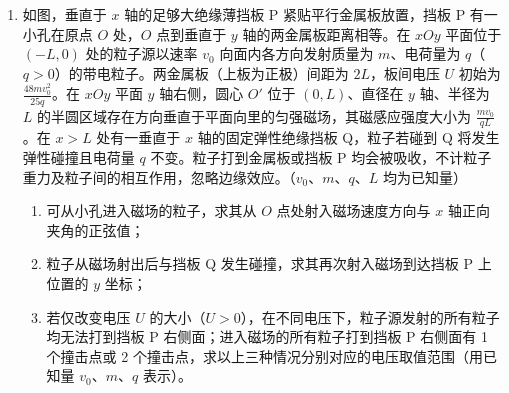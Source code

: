 \documentclass[\gkver]{gaokaozhenti}
\begin{document}
\begin{enumerate}
{所以 AB 段动量的变化量为 $\Delta p=mv-0=720\Ukgms$。

（3）乙从 A 滑到 B 的过程根据运动学公式有 $L=v_{0}t'+\frac{1}{2}at'^{2}$，

代入数据解得 $t'=4\Us$。

甲在地面上做匀减速运动，根据牛顿第二定律有 $\mu_{2}mg=ma_{2}$，

可得 $a_{2}=1\Umsq$。

甲到达 B 点的速度为 $v=12\Ums$，在 $4\Us$ 内甲没有停止；

在 $t'=4\Us$ 内，甲运动的距离 $x=vt'-\frac{1}{2}a_{2}t'^{2}$，

代入数据解得 $x=40\Um$，即甲乙之间的距离为 $40\Um$。
}

\item
如图，垂直于 $x$ 轴的足够大绝缘薄挡板 P 紧贴平行金属板放置，挡板 P 有一小孔在原点 $O$ 处，$O$ 点到垂直于 $y$ 轴的两金属板距离相等。在 $xOy$ 平面位于 $(-L,0)$ 处的粒子源以速率 $v_{0}$ 向面内各方向发射质量为 $m$、电荷量为 $q$（$q>0$）的带电粒子。两金属板（上板为正极）间距为 $2L$，板间电压 $U$ 初始为 $\frac{48mv_{0}^{2}}{25q}$。在 $xOy$ 平面 $y$ 轴右侧，圆心 $O'$ 位于 $(0,L)$、直径在 $y$ 轴、半径为 $L$ 的半圆区域存在方向垂直于平面向里的匀强磁场，其磁感应强度大小为 $\frac{mv_{0}}{qL}$。在 $x>L$ 处有一垂直于 $x$ 轴的固定弹性绝缘挡板 Q，粒子若碰到 Q 将发生弹性碰撞且电荷量 $q$ 不变。粒子打到金属板或挡板 P 均会被吸收，不计粒子重力及粒子间的相互作用，忽略边缘效应。（$v_{0}$、$m$、$q$、$L$ 均为已知量）
\begin{enumerate}
	\item
	可从小孔进入磁场的粒子，求其从 $O$ 点处射入磁场速度方向与 $x$ 轴正向夹角的正弦值；
	\item
	粒子从磁场射出后与挡板 Q 发生碰撞，求其再次射入磁场到达挡板 P 上位置的 $y$ 坐标；
	\item
	若仅改变电压 $U$ 的大小（$U>0$），在不同电压下，粒子源发射的所有粒子均无法打到挡板 P 右侧面；进入磁场的所有粒子打到挡板 P 右侧面有 1 个撞击点或 2 个撞击点，求以上三种情况分别对应的电压取值范围（用已知量 $v_{0}$、$m$、$q$ 表示）。
\end{enumerate}
\onepicture[align=right, w=10.60cm]{}

\end{enumerate}
\end{document}
